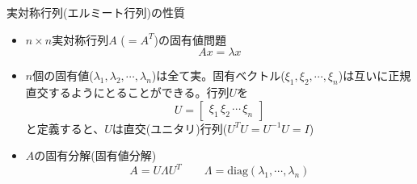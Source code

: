 \begin{frame}[t,fragile]{実対称行列(エルミート行列)の性質}
  \begin{itemize}
  \item $n \times n$実対称行列$A$ ($=A^T$)の固有値問題
    \[
    A x = \lambda x
    \]
  \item $n$個の固有値($\lambda_1,\lambda_2,\cdots,\lambda_n$)は全て実。固有ベクトル($\xi_1,\xi_2,\cdots,\xi_n$)は互いに正規直交するようにとることができる。行列$U$を
    \[
    U = \begin{bmatrix} \xi_1 \, \xi_2 \, \cdots \, \xi_n \end{bmatrix}
    \]
    と定義すると、$U$は直交(ユニタリ)行列($U^T U = U^{-1} U = I$)
  \item $A$の固有分解(固有値分解)
    \[
    A = U \Lambda U^T \qquad \Lambda = \text{diag}(\lambda_1,\cdots,\lambda_n)
    \]
  \end{itemize}
\end{frame}
